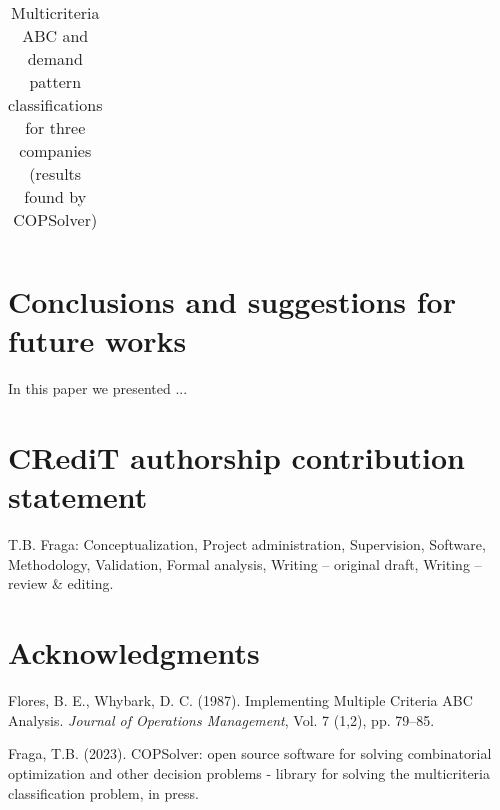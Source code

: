 \documentclass[authoryear,manuscript,12pt]{elsarticle}
\begin{document}
\begin{table}[h!]
\begin{center}
\begin{small}
\begin{tabular}[c]{l r r | l r r r r}
\end{tabular}
\caption{Multicriteria ABC and demand pattern classifications for three companies (results found by COPSolver)}
\label{tab:results}
\end{small}
\end{center}
\end{table} 



\section{Conclusions and suggestions for future works}
\label{sec:conclusions}

In this paper we presented ...

\section{CRediT authorship contribution statement} 
\label{sec:contributions}

T.B. Fraga: Conceptualization, Project administration, Supervision, Software, Methodology, Validation, Formal analysis, Writing – original draft, Writing – review \& editing. 

\section{Acknowledgments}
\label{sec:acknowledgments}





\begin{thebibliography}{1}


Flores, B. E., Whybark, D. C. (1987). Implementing Multiple Criteria ABC Analysis. {\it Journal of Operations Management}, Vol. 7 (1,2), pp. 79--85.

Fraga, T.B. (2023). COPSolver: open source software for solving combinatorial optimization and other decision problems - library for solving the multicriteria classification problem, in press.

\end{thebibliography}
\end{document}
